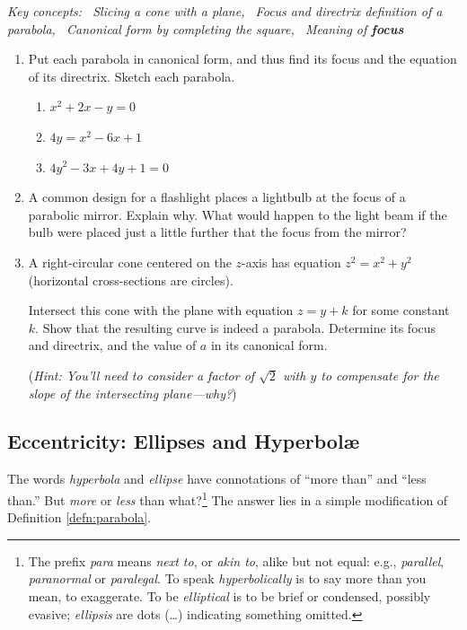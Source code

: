 \begin{exercises}{}{}
	\hangindent\leftmargini\emph{Key concepts: \ Slicing a cone with a plane, \ Focus and directrix definition of a parabola, \ Canonical form by completing the square, \ Meaning of \textbf{focus}}
	
	\begin{enumerate}
	  \item Put each parabola in canonical form, and thus find its focus and the equation of its directrix. Sketch each parabola.
	  \begin{enumerate}
	    \item $x^2+2x-y=0$
	    \item $4y=x^2-6x+1$
	    \item $4y^2-3x+4y+1=0$
	  \end{enumerate}
	  
	  \item A common design for a flashlight places a lightbulb at the focus of a parabolic mirror. Explain why. What would happen to the light beam if the bulb were placed just a little further that the focus from the mirror?
	  
	  \item A right-circular cone centered on the $z$-axis has equation $z^2=x^2+y^2$ (horizontal cross-sections are circles).\par
		Intersect this cone with the plane with equation $z=y+k$ for some constant $k$. Show that the resulting curve is indeed a parabola. Determine its focus and directrix, and the value of $a$ in its canonical form.\par
		(\emph{Hint: You'll need to consider a factor of $\sqrt{2}$ with $y$ to compensate for the slope of the intersecting plane---why?})


	\end{enumerate}
\end{exercises}


\clearpage



\subsection{Eccentricity: Ellipses and Hyperbolæ}

The words \emph{hyperbola} and \emph{ellipse} have connotations of ``more than'' and ``less than.'' But \emph{more} or \emph{less} than what?\footnote{%
	The prefix \emph{para} means \emph{next to}, or \emph{akin to}, alike but not equal: e.g., \emph{parallel}, \emph{paranormal} or \emph{paralegal}. To speak \emph{hyperbolically} is to say more than you mean, to exaggerate. To be \emph{elliptical} is to be brief or condensed, possibly evasive; \emph{ellipsis} are dots (\ldots) indicating something omitted.%
}
The answer lies in a simple modification of Definition \ref{defn:parabola}.

